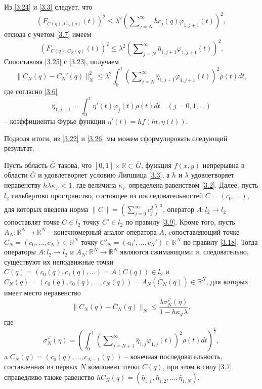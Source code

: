 Из \eqref{3.24} и \eqref{3.3} следует, что
$$
(F_{C(q),C_N(q)}(t))^2\le \lambda^2   \left(\sum\nolimits_{j=N}^\infty hc_j(q)\varphi_{1,j+1}(t)\right)^2,
$$
отсюда с учетом \eqref{3.7} имеем
\begin{equation}\label{3.25}
(F_{C(q),C_N(q)}(t))^2\le \lambda^2   \left(\sum\nolimits_{j=N}^\infty  \hat \eta_{1,j+1}\varphi_{1,j+1}(t)\right)^2.
\end{equation}
Сопоставляя \eqref{3.25} с \eqref{3.23}, получаем
\begin{equation}\label{3.26}
\|C_N(q)- C_N'(q)\|_N^2\le \lambda^2\int_{0}^1\left(\sum\nolimits_{j=N}^\infty \hat \eta_{1,j+1} \varphi_{1,j+1}(t)\right)^2\rho(t) dt,
\end{equation}
где согласно \eqref{3.6}
\begin{equation}\label{3.27}
 \hat \eta_{1,j+1}=\int_{0}^1\eta'(t)\varphi_j(t)\rho(t)dt \quad(j=0,1,\ldots)
\end{equation}
-- коэффициенты Фурье функции $\eta'(t)=hf(ht,\eta(t))$.

Подводя итоги, из \eqref{3.22} и \eqref{3.26}  мы можем сформулировать следующий результат.
\begin{theorem} Пусть область $\bar G$ такова, что $[0,1]\times\mathbb{R}\subset \bar G$, функция $f(x,y)$ непрерывна в области $\bar G$ и удовлетворяет условию Липшица \eqref{3.3}, а $h$ и $\lambda$ удовлетворяет неравенству $h\lambda\kappa_\varphi<1$, где величина $\kappa_\varphi$ определена равенством \eqref{3.2}. Далее, пусть $l_2$ гильбертово пространство, состоящее из последовательностей $C=(c_0,\ldots)$, для которых введена норма $\|C\|=\left(\sum_{j=0}^\infty c_j^2\right)^\frac12$,   оператор $A: l_2\to l_2$ сопоставлят точке $C\in l_2$ точку $C'\in l_2$ по правилу \eqref{3.9}. Кроме того, пусть $A_N:\mathbb{R}^N\to \mathbb{R}^N$ -- конечномерный аналог оператора $A$, cопоставляющий точке $C_N=(c_0,\ldots,c_{N})\in \mathbb{R}^N $ точку  $C'_N=(c_0',\ldots,c_{N}')\in \mathbb{R}^N $ по правилу \eqref{3.18}.
Тогда операторы $A: l_2\to l_2$ и $A_N:\mathbb{R}^N\to \mathbb{R}^N$ являются сжимающими и, следовательно, существуют  их неподвижные точки $C(q)=(c_0(q),c_1(q),\ldots)=A(C(q))\in l_2$ и $\bar C_N(q)=(\bar c_0(q),\bar c_0(q),\ldots,\bar c_{N}(q))=A_N(\bar C_N(q))\in \mathbb{R}^N$, для которых имеет место неравенство
\begin{equation}\label{3.28}
\|C_N(q)-\bar C_N(q)\|_N\le \frac{\lambda \sigma_N^\varphi(\eta)}{1-h\kappa_\varphi\lambda},
\end{equation}
где
\begin{equation}\label{3.29}
\sigma_N^\varphi(\eta)=\left(\int_{0}^1\left(\sum\nolimits_{j=N+1}^\infty \hat \eta_{1,j}\varphi_{1,j}(t)\right)^2\rho(t) dt\right)^\frac12,
\end{equation}
 a $C_N(q)=(c_0(q),\ldots,c_{N-1}(q))$ -- конечная последовательность, составленная из первых $N$ компонент точки  $C(q)$, при этом в силу  \eqref{3.7} справедливо также равенство  $hC_N(q)=(\hat \eta_{1,1},\hat \eta_{1,2}, \ldots, \hat \eta_{1,N})$.
\end{theorem}


